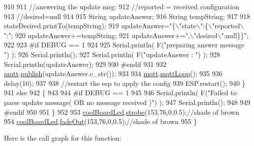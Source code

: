 \begin{DoxyCode}
910 
911                 \textcolor{comment}{//answering the update msg:}
912             \textcolor{comment}{//reported = received configuration}
913             \textcolor{comment}{//desired=null}
914         
915             String updateAnswer;
916             String tempString;
917             
918             stateDesired.printTo(tempString);
919             updateAnswer=\textcolor{stringliteral}{"\{\(\backslash\)"state\(\backslash\)":\{\(\backslash\)"reported\(\backslash\)":"};
920             updateAnswer+=tempString;
921             updateAnswer+=\textcolor{stringliteral}{",\(\backslash\)"desired\(\backslash\)":null\}\}"};
922 
923 \textcolor{preprocessor}{        #if DEBUG == 1}
924 
925             Serial.println( F(\textcolor{stringliteral}{"preparing answer message "}) );
926             Serial.println();
927             Serial.println( F(\textcolor{stringliteral}{"updateAnswer : "}) );
928             Serial.println(updateAnswer);
929         
930 \textcolor{preprocessor}{        #endif  }
931 
932             \hyperlink{classCoolBoard_a2399f44d7c23c1149a335cb3b46d90f1}{mqtt}.\hyperlink{classCoolMQTT_ace977b3e90ab14b1199fe5c4fb0a13ec}{publish}(updateAnswer.c\_str());
933             
934             \hyperlink{classCoolBoard_a2399f44d7c23c1149a335cb3b46d90f1}{mqtt}.\hyperlink{classCoolMQTT_aa5eaae967b562b62cbcf2b8d81f6e5d5}{mqttLoop}();
935 
936             delay(10);
937             
938             \textcolor{comment}{//restart the esp to apply the config}
939             ESP.restart();
940     \}
941     \textcolor{keywordflow}{else}
942     \{
943     
944 \textcolor{preprocessor}{    #if DEBUG == 1}
945 
946         Serial.println( F(\textcolor{stringliteral}{"Failed to parse update message( OR no message received )"}) );
947         Serial.println();
948     
949 \textcolor{preprocessor}{    #endif}
950     
951     \}
952 
953     \hyperlink{classCoolBoard_a1b1d3c684a5baa56b08486e192fd8e97}{coolBoardLed}.\hyperlink{classCoolBoardLed_ad5f0de4c628cbfbf49896042831c64ad}{strobe}(153,76,0,0.5);\textcolor{comment}{//shade of brown}
954     \hyperlink{classCoolBoard_a1b1d3c684a5baa56b08486e192fd8e97}{coolBoardLed}.\hyperlink{classCoolBoardLed_a93d545679237e8cc858324367149775c}{fadeOut}(153,76,0,0.5);\textcolor{comment}{//shade of brown                              }
955 \}
\end{DoxyCode}
Here is the call graph for this function\+:
\nopagebreak
